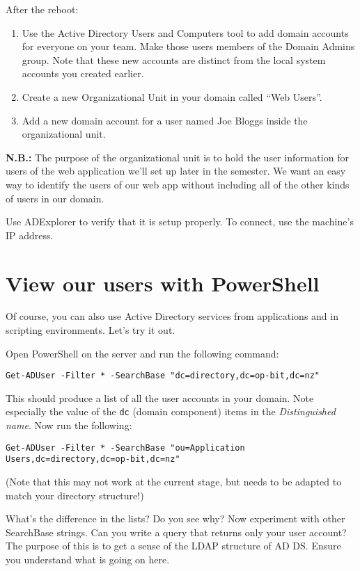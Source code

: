 \documentclass{article}
\begin{document}
After the reboot:
\begin{enumerate}
	\item Use the Active Directory Users and Computers tool to add domain accounts for everyone on your team.  Make those users members of the Domain Admins group. Note that these new accounts are distinct from the local system accounts you created earlier.
	\item Create a new Organizational Unit in your domain called ``Web Users''. %
	\item Add a new domain account for a user named Joe Bloggs inside the organizational unit.
\end{enumerate}

\textbf{N.B.:} The purpose of the organizational unit is to hold the user information for users of the web application we'll set up later in the semester. We want an easy way to identify the users of our web app without including all of the other kinds of users in our domain.

Use ADExplorer to verify that it is setup properly. To connect, use the machine's IP address.

\section{View our users with PowerShell}

Of course, you can also use Active Directory services from applications and in scripting environments. Let's try it out.

Open PowerShell on the server and run the following command: 

\texttt{Get-ADUser -Filter * -SearchBase "dc=directory,dc=op-bit,dc=nz"}

This should produce a list of all the user accounts in your domain.  Note especially the value of the \texttt{dc} (domain component) items in the \emph{Distinguished name}. Now run the following:

\texttt{Get-ADUser -Filter * -SearchBase "ou=Application Users,dc=directory,dc=op-bit,dc=nz"}

(Note that this may not work at the current stage, but needs to be adapted to match your directory structure!)

What's the difference in the lists? Do you see why?  Now experiment with other SearchBase strings. Can you write a query that returns only your user account? The purpose of this is to get a sense of the LDAP
structure of AD DS. Ensure you understand what is going on here.
\end{document}
